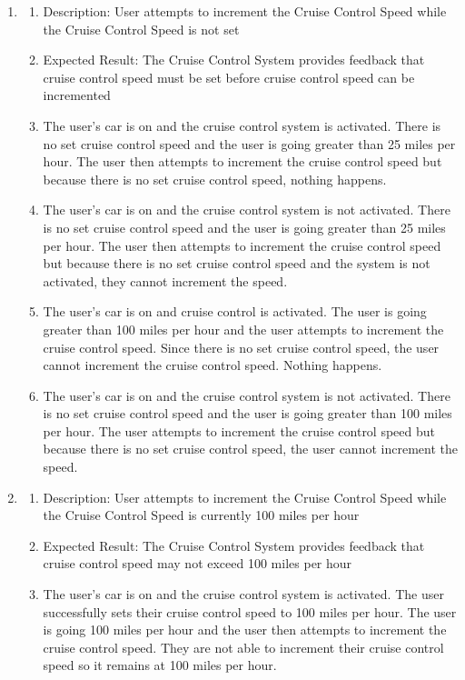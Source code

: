 \documentclass[preprint,11pt,3p]{article}
\begin{document}
\begin{enumerate}
	\item 
		\begin{enumerate}
	\item Description: User attempts to increment the Cruise Control Speed while the Cruise Control Speed is not set
	\item Expected Result: The Cruise Control System provides feedback that cruise control speed must be set before cruise control speed can be incremented
	\item The user’s car is on and the cruise control system is activated. There is no set cruise control speed and the user is going greater than 25 miles per hour. The user then attempts to increment the cruise control speed but because there is no set cruise control speed, nothing happens. 
	\item The user’s car is on and the cruise control system is not activated. There is no set cruise control speed and the user is going greater than 25 miles per hour. The user then attempts to increment the cruise control speed but because there is no set cruise control speed and the system is not activated, they cannot increment the speed.
	\item The user’s car is on and cruise control is activated. The user is going greater than 100 miles per hour and the user attempts to increment the cruise control speed. Since there is no set cruise control speed, the user cannot increment the cruise control speed. Nothing happens. 
	\item The user’s car is on and the cruise control system is not activated. There is no set cruise control speed and the user is going greater than 100 miles per hour. The user attempts to increment the cruise control speed but because there is no set cruise control speed, the user cannot increment the speed.  
\end{enumerate}
	
	\item 
		\begin{enumerate}
	\item Description: User attempts to increment the Cruise Control Speed while the Cruise Control Speed is currently 100 miles per hour
	\item Expected Result: The Cruise Control System provides feedback that cruise control speed may not exceed 100 miles per hour
	\item The user’s car is on and the cruise control system is activated. The user successfully sets their cruise control speed to 100 miles per hour. The user is going 100 miles per hour and the user then attempts to increment the cruise control speed. They are not able to increment their cruise control speed so it remains at 100 miles per hour. 
\end{enumerate}


\end{enumerate}
\end{document}
